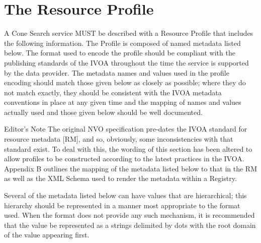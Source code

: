 \documentclass[11pt,a4paper]{ivoa}
\begin{document}
\section{The Resource Profile}
\label{sec:regext}
A Cone Search service MUST be described with a Resource Profile that includes the following information. The Profile is composed of named metadata listed below. The format used to encode the profile should be compliant with the publishing standards of the IVOA throughout the time the service is supported by the data provider. The metadata names and values used in the profile encoding should match those given below as closely as possible; where they do not match exactly, they should be consistent with the IVOA metadata conventions in place at any given time and the mapping of names and values actually used and those given below should be well documented.
\begin{bigdescription}
\item[Editor's Note] The original NVO specification pre-dates the IVOA standard for resource metadata [RM], and so, obviously, some inconsistencies with that standard exist. To deal with this, the wording of this section has been altered to allow profiles to be constructed according to the latest practices in the IVOA. Appendix B outlines the mapping of the metadata listed below to that in the RM as well as the XML Schema used to render the metadata within a Registry.
\end{bigdescription}
Several of the metadata listed below can have values that are hierarchical; this hierarchy should be represented in a manner most appropriate to the format used. When the format does not provide any such mechanism, it is recommended that the value be represented as a strings delimited by dots with the root domain of the value appearing first.
\end{document}
